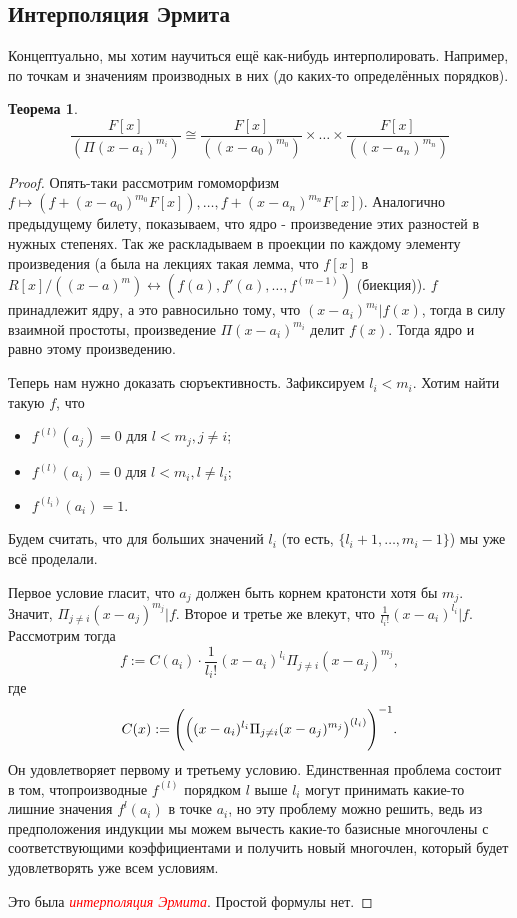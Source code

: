 \documentclass[a4paper,100pt]{article}
\theoremstyle{indented}
\newtheorem{theorem}{Теорема}
\theoremstyle{definition}
\theoremstyle{remark}
\begin{document}
\resetall

\subsection{Интерполяция Эрмита}

Концептуально, мы хотим научиться ещё как-нибудь интерполировать. Например, по точкам и значениям производных в них (до каких-то определённых порядков).\\

\begin{theorem}
    \[
        \frac{F[x]}{(\Pi(x-a_i)^{m_i})}\cong \frac{F[x]}{((x-a_0)^{m_0})}\times \dots \times \frac{F[x]}{((x-a_n)^{m_n})}
    \]
\end{theorem}

\begin{proof}
    Опять-таки рассмотрим гомоморфизм $f\mapsto (f+(x-a_0)^{m_0}F[x]), \dots , f+(x-a_n)^{m_n}F[x])$. Аналогично предыдущему билету, показываем, что ядро - произведение этих разностей в нужных степенях. Так же раскладываем в проекции по каждому элементу произведения (а была на лекциях такая лемма, что $f[x]$ в $R[x]/((x-a)^m)\longleftrightarrow (f(a), f'(a), \dots, f^{(m-1)})$ (биекция)). $f$ принадлежит ядру, а это равносильно тому, что $(x-a_i)^{m_i}\vert f(x)$, тогда в силу взаимной простоты, произведение $\Pi(x-a_i)^{m_i}$ делит $f(x)$. Тогда ядро и равно этому произведению.\ 

    Теперь нам нужно доказать сюръективность. Зафиксируем $l_i<m_i$. Хотим найти такую $f$, что\\

    \begin{itemize}
        \item $f^{(l)}(a_j)=0$ для $l<m_j, j\neq i$;
        \item $f^{(l)}(a_i)=0$ для $l<m_i, l\neq l_i$;
        \item $f^{(l_i)}(a_i)=1$.
    \end{itemize}

    Будем считать, что для больших значений $l_i$ (то есть, $\{l_i+1, \dots, m_i-1\}$) мы уже всё проделали.\ 

    Первое условие гласит, что $a_j$ должен быть корнем кратонсти хотя бы $m_j$. Значит, $\Pi_{j\neq i}(x-a_j)^{m_j}\vert f$. Второе и третье же влекут, что $\frac{1}{l_i!}(x-a_i)^{l_i}\vert f$. Рассмотрим тогда 
    \[
        f:=C(a_i)\cdot \frac{1}{l_i!}(x-a_i)^{l_i}\Pi_{j\neq i}(x-a_j)^{m_j}, 
    \]
    где 
    \[
        C(x):=\Biggl(\Bigl((x-a_i)^{l_i}\Pi_{j\neq i}(x-a_j)^{m_j}\bigr)^{(l_i)}\Biggr)^{-1}.
    \]
    Он удовлетворяет первому и третьему условию. Единственная проблема состоит в том, чтопроизводные $f^{(l)}$ порядком $l$ выше $l_i$ могут принимать какие-то лишние значения $f^{l}(a_i)$ в точке $a_i$, но эту проблему можно решить, ведь из предположения индукции мы можем вычесть какие-то базисные многочлены с соответствующими коэффициентами и получить новый многочлен, который будет удовлетворять уже всем условиям.\

    Это была \hypertarget{n36}{\textcolor{red}{\textit{интерполяция Эрмита}}}. Простой формулы нет.
\end{proof}
\end{document}
